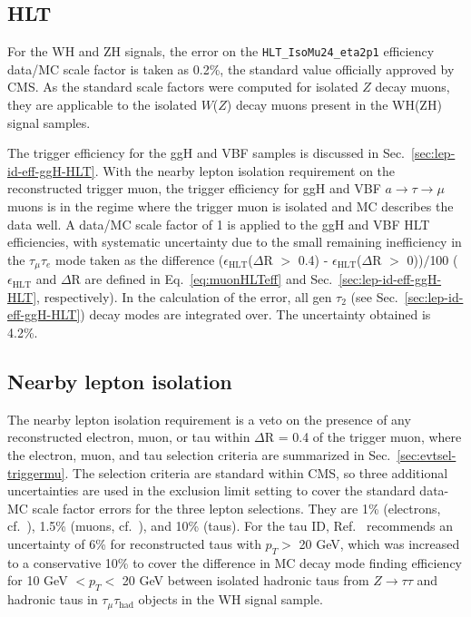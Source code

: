 \subsection{HLT\label{lepideff-HLT}}

For the WH and ZH signals, the error on the \texttt{HLT\_IsoMu24\_eta2p1} efficiency data/MC scale factor is taken as 0.2\%, the standard value officially approved by CMS.  As the standard scale factors were computed for isolated $Z$ decay muons, they are applicable to the isolated $W$($Z$) decay muons present in the WH(ZH) signal samples.

The trigger efficiency for the ggH and VBF samples is discussed in Sec.~\ref{sec:lep-id-eff-ggH-HLT}.  With the nearby lepton isolation requirement on the reconstructed trigger muon, the trigger efficiency for ggH and VBF $a\rightarrow\tau\to\mu$ muons is in the regime where the trigger muon is isolated and MC describes the data well.  A data/MC scale factor of 1 is applied to the ggH and VBF HLT efficiencies, with systematic uncertainty due to the small remaining inefficiency in the $\tau_{\mu}\tau_{e}$ mode taken as the difference ($\epsilon_{\text{HLT}}$($\Delta$R $>$ 0.4) - $\epsilon_{\text{HLT}}$($\Delta$R $>$ 0))$/$100 ($\epsilon_{\text{HLT}}$ and $\Delta$R are defined in Eq.~\ref{eq:muonHLTeff} and Sec.~\ref{sec:lep-id-eff-ggH-HLT}, respectively).  In the calculation of the error, all gen $\tau_{\text{2}}$ (see Sec.~\ref{sec:lep-id-eff-ggH-HLT}) decay modes are integrated over.  The uncertainty obtained is 4.2\%.

\subsection{Nearby lepton isolation\label{lepideff-leptonveto}}

The nearby lepton isolation requirement is a veto on the presence of any reconstructed electron, muon, or tau within $\Delta$R = 0.4 of the trigger muon, where the electron, muon, and tau selection criteria are summarized in Sec.~\ref{sec:evtsel-triggermu}.  The selection criteria are standard within CMS, so three additional uncertainties are used in the exclusion limit setting to cover the standard data-MC scale factor errors for the three lepton selections.  They are 1\% (electrons, cf.~\cite{CMS:egammauncertaintytwiki}), 1.5\% (muons, cf.~\cite{CMS:muonuncertaintytwiki}), and 10\% (taus).  For the tau ID, Ref.~\cite{CMS:tauuncertaintytwiki} recommends an uncertainty of 6\% for reconstructed taus with $p_T >$ 20 GeV, which was increased to a conservative 10\% to cover the difference in MC decay mode finding efficiency for 10 GeV $< p_T <$ 20 GeV between isolated hadronic taus from $Z\rightarrow\tau\tau$ and hadronic taus in $\tau_{\mu}\tau_{\text{had}}$ objects in the WH signal sample.

